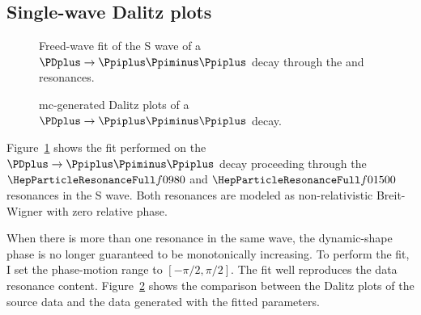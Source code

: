 \subsection{Single-wave Dalitz plots}

    \begin{figure}
        \centering

        \subfloat[][]{}

        \subfloat[][]{}

        \caption{Freed-wave fit of the S wave of a $\PDplus \to \Ppiplus\Ppiminus\Ppiplus$ decay through the \Pfnez{} and \Pfofzz{} resonances.~\Star}
        \label{fig:f0_f2_fit}
    \end{figure}
    \begin{figure}
        \centering


        \caption{\ac{mc}-generated Dalitz plots of a $\PDplus \to \Ppiplus\Ppiminus\Ppiplus$ decay.~\Star}
        \label{fig:f0_f2_dalitz}
    \end{figure}
    Figure~\ref{fig:f0_f2_fit} shows the fit performed on the $\PDplus\to\Ppiplus\Ppiminus\Ppiplus$ decay proceeding through the $\Pfnez{}$ and $\Pfofzz{}$ resonances in the S wave.
    Both resonances are modeled as non-relativistic Breit-Wigner with zero relative phase.


    When there is more than one resonance in the same wave, the dynamic-shape phase is no longer guaranteed to be monotonically increasing.
    To perform the fit, I set the phase-motion range to $[-\pi/2, \pi/2]$.
    The fit well reproduces the data resonance content.
    Figure~\ref{fig:f0_f2_dalitz} shows the comparison between the Dalitz plots of the source data and the data generated with the fitted parameters.

